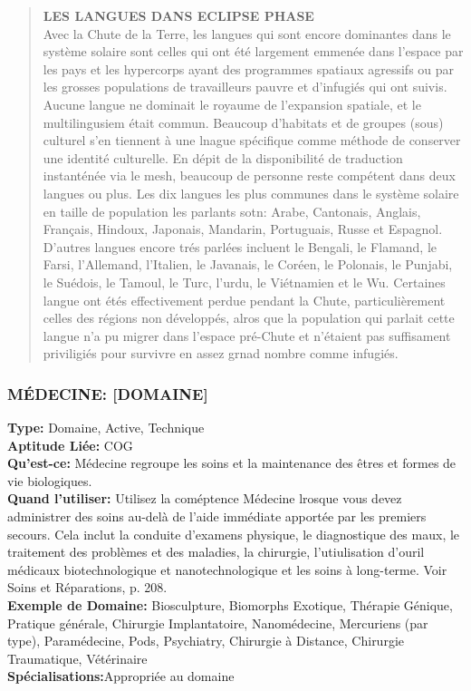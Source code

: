 \begin{quotation} \textbf{LES LANGUES DANS ECLIPSE PHASE} \\ Avec la Chute de la Terre, les langues qui sont encore dominantes dans le système solaire sont celles qui ont été largement emmenée dans l'espace par les pays et les hypercorps ayant des programmes spatiaux agressifs ou par les grosses populations de travailleurs pauvre et d'infugiés qui ont suivis. Aucune langue ne dominait le royaume de l'expansion spatiale, et le multilingusiem était commun. Beaucoup d'habitats et de groupes (sous) culturel s'en tiennent à une lnague spécifique comme méthode de conserver une identité culturelle. En dépit de la disponibilité de traduction instanténée via le mesh, beaucoup de personne reste compétent dans deux langues ou plus. Les dix langues les plus communes dans le système solaire en taille de population les parlants sotn: Arabe, Cantonais, Anglais, Français, Hindoux, Japonais, Mandarin, Portuguais, Russe et Espagnol. D'autres langues encore trés parlées incluent le Bengali, le Flamand, le Farsi, l'Allemand, l'Italien, le Javanais, le Coréen, le Polonais, le Punjabi, le Suédois, le Tamoul, le Turc, l'urdu, le Viétnamien et le Wu.  Certaines langue ont étés effectivement perdue pendant la Chute, particulièrement celles des régions non développés, alros que la population qui parlait cette langue n'a pu migrer dans l'espace pré-Chute et n'étaient pas suffisament priviligiés pour survivre en assez grnad nombre comme infugiés. \end{quotation} 





\subsubsection{MÉDECINE: [DOMAINE]} \textbf{Type:} Domaine, Active, Technique \\ \textbf{Aptitude Liée:} COG \\ \textbf{Qu'est-ce:} Médecine regroupe les soins et la maintenance des êtres et formes de vie biologiques. \\ \textbf{Quand l'utiliser:} Utilisez la coméptence Médecine lrosque vous devez administrer des soins au-delà de l'aide immédiate apportée par les premiers secours. Cela inclut la conduite d'examens physique, le diagnostique des maux, le traitement des problèmes et des maladies, la chirurgie, l'utiulisation d'ouril médicaux biotechnologique et nanotechnologique et les soins à long-terme. Voir Soins et Réparations, p. 208. \\ \textbf{Exemple de Domaine:} Biosculpture, Biomorphs Exotique, Thérapie Génique, Pratique générale, Chirurgie Implantatoire, Nanomédecine, Mercuriens (par type), Paramédecine, Pods, Psychiatry, Chirurgie à Distance, Chirurgie Traumatique, Vétérinaire \\ \textbf{Spécialisations:}Appropriée au domaine 

